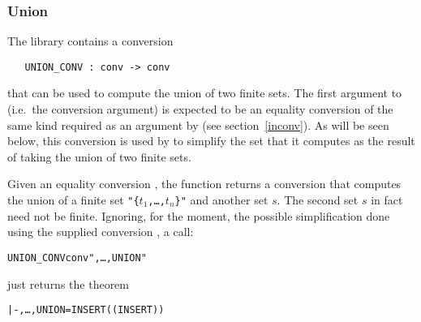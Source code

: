 \subsubsection{Union}

The%
 library contains a conversion 

\begin{hol}\begin{verbatim}
   UNION_CONV : conv -> conv
\end{verbatim}\end{hol}

\noindent that can be used to compute the union of two finite sets.  The first
argument to  (i.e.\ the conversion argument) is expected to be
an equality conversion of the same kind required as an argument by
 (see section~\ref{inconv}).  As will be seen below, this
conversion is used by  to simplify the set that it computes as
the result of taking the union of two finite sets.

Given an equality conversion , the function  returns a
conversion that computes the union of a finite set
{\small\verb!"{!\tt$t_1$,\dots,$t_n$\verb!}"!} and another set {\small$s$}. The
second set {\small$s$} in fact need not be finite.  Ignoring, for the moment,
the possible simplification done using the supplied conversion , a
call:

\begin{hol}\begin{alltt}
   UNION\_CONV conv "\lb{},\dots,\rb UNION "
\end{alltt}\end{hol}

\noindent just returns the theorem

\begin{hol}\begin{alltt}
   |- \lb{},\dots,\rb UNION  =  INSERT (\m{\dots} ( INSERT )\m{\dots})
\end{alltt}\end{hol}

